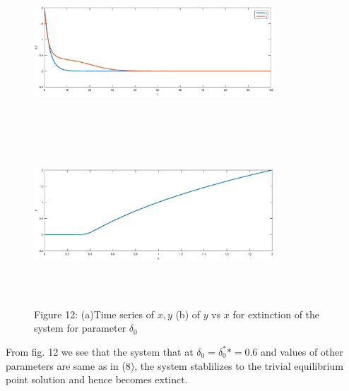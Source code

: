 \documentclass[a4paper, 10pt]{article}
\begin{document}
\begin{figure}[H]
	{\includegraphics[width=9cm, height=6cm]{19a.eps}}
	\endminipage\hfill
	{\includegraphics[width=9cm, height=6cm]{19b.eps}}
	\endminipage\hfill
	\begin{center} Figure 12: (a)Time series of $x,y$  (b)  of $y$ vs $x$ for extinction of the system for parameter $\delta_0$   \end{center}
\end{figure}  
From fig. 12 we see that the system that at $\delta_0=\delta_0^**=0.6$ and values of other parameters are same as in (8), the system stablilizes to the trivial equilibrium point solution and hence becomes extinct. 
\end{document}
